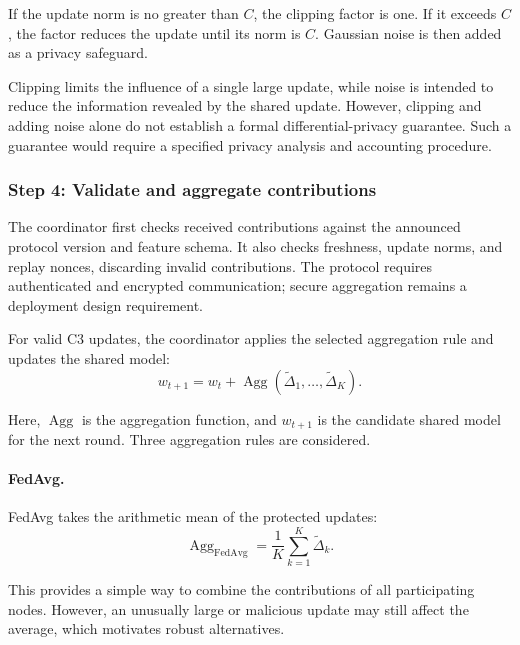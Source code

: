 If the update norm is no greater than $C$, the clipping factor is
one. If it exceeds $C$, the factor reduces the update until its norm
is $C$. Gaussian noise is then added as a privacy safeguard.

Clipping limits the influence of a single large update, while noise
is intended to reduce the information revealed by the shared update.
However, clipping and adding noise alone do not establish a formal
differential-privacy guarantee. Such a guarantee would require a
specified privacy analysis and accounting procedure.

\subsubsection{Step 4: Validate and aggregate contributions}

The coordinator first checks received contributions against the
announced protocol version and feature schema. It also checks
freshness, update norms, and replay nonces, discarding invalid
contributions. The protocol requires authenticated and encrypted
communication; secure aggregation remains a deployment design
requirement.

For valid C3 updates, the coordinator applies the selected aggregation
rule and updates the shared model:
\begin{equation}
w_{t+1}
=
w_t+
\operatorname{Agg}\!\left(
\widetilde{\Delta}_1,\ldots,
\widetilde{\Delta}_K
\right).
\label{g4-eq:protocol-model-aggregation}
\end{equation}

Here, $\operatorname{Agg}$ is the aggregation function, and
$w_{t+1}$ is the candidate shared model for the next round. Three
aggregation rules are considered.

\paragraph{FedAvg.}

FedAvg takes the arithmetic mean of the protected updates:
\begin{equation}
\operatorname{Agg}_{\mathrm{FedAvg}}
=
\frac{1}{K}\sum_{k=1}^{K}
\widetilde{\Delta}_k.
\label{g4-eq:protocol-fedavg}
\end{equation}

This provides a simple way to combine the contributions of all
participating nodes. However, an unusually large or malicious update
may still affect the average, which motivates robust alternatives.

